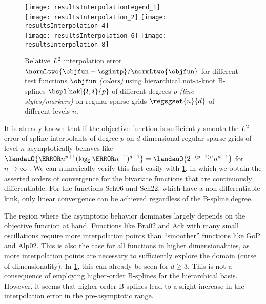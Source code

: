 \begin{figure}
  \texttt{[image: resultsInterpolationLegend\_1]}\\[2mm]%
  \texttt{[image: resultsInterpolation\_2]}%
  \hfill%
  \texttt{[image: resultsInterpolation\_4]}%
  \\[2mm]%
  \texttt{[image: resultsInterpolation\_6]}%
  \hfill%
  \texttt{[image: resultsInterpolation\_8]}%
  \caption[Relative interpolation error for different test functions]{%
    Relative $L^2$ interpolation error
    $\normLtwo{\objfun - \sgintp}/\normLtwo{\objfun}$
    for different test functions $\objfun$ \emph{(colors)}
    using hierarchical not-a-knot B-splines
    $\bspl[\nak]{\*l,\*i}{p}$ of different degrees $p$
    \emph{(line styles/markers)} on
    regular sparse grids $\regsgset{n}{d}$ of different levels $n$.%
  }%
  \label{fig:resultsInterpolationErrorTestFunctions}%
\end{figure}

It is already known that
if the objective function is sufficiently smooth
the $L^2$ error of spline interpolants of degree $p$ on
$d$-dimensional regular sparse grids of level $n$
asymptotically behaves like
$\landauO{\ms{n}^{p+1} (\log_2 \ms{n}^{-1})^{d-1}}
= \landauO{2^{-(p+1)n} n^{d-1}}$ for $n \to \infty$ \cite{Sickel11Spline}.
We can numerically verify this fact easily with
\cref{fig:resultsInterpolationErrorTestFunctions},
in which we obtain the asserted orders of convergence
for the bivariate functions that are continuously differentiable.
For the functions Sch06 and Sch22, which have a non-differentiable kink,
only linear convergence can be achieved regardless of the B-spline degree.

\vspace*{\fill}

The region where the asymptotic behavior dominates largely depends
on the objective function at hand.
Functions like Bra02 and Ack with many small oscillations
require more interpolation points than ``smoother'' functions like
GoP and Alp02.
This is also the case for all functions in higher dimensionalities,
as more interpolation points are necessary to sufficiently explore the domain
(curse of dimensionality).
In \cref{fig:resultsInterpolationErrorTestFunctions}, this can already be seen
for $d \ge 3$.
This is not a consequence of employing higher-order B-splines for
the hierarchical basis.
However, it seems that higher-order B-splines lead to a slight increase
in the interpolation error in the pre-asymptotic range.

